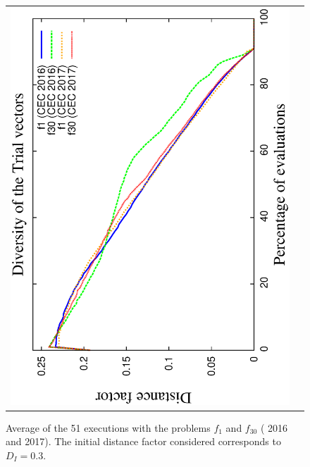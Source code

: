 \begin{figure}[t]
\begin{tabular}{cc}
   \includegraphics[scale=0.23, angle=-90]{img/ED/Diversity_Trial.eps} 
\end{tabular}
\caption{ Average \DCN{} of the 51 executions with the problems $f_1$ and $f_{30}$ (\CEC{} 2016 and \CEC{} 2017). The initial distance factor considered corresponds to $D_I=0.3$.}
\label{fig:diversity}
\end{figure}


